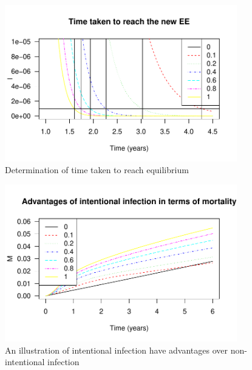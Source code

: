 \documentclass{beamer}
\begin{document}
\begin{frame}
\begin{figure}[h]
  \centering
  \includegraphics[width=0.9\textwidth]{Figures/I_less_than_0_000001.pdf}
  \caption{Determination of time taken to reach equilibrium}
\end{figure}
\end{frame}
\begin{frame}
\begin{figure}[H]
  \centering
  \includegraphics[width=0.9\textwidth]{Figures/dMdt.pdf}
  \caption{An illustration of intentional infection have advantages over non-intentional infection}
\end{figure}
\end{frame}
\end{document}
